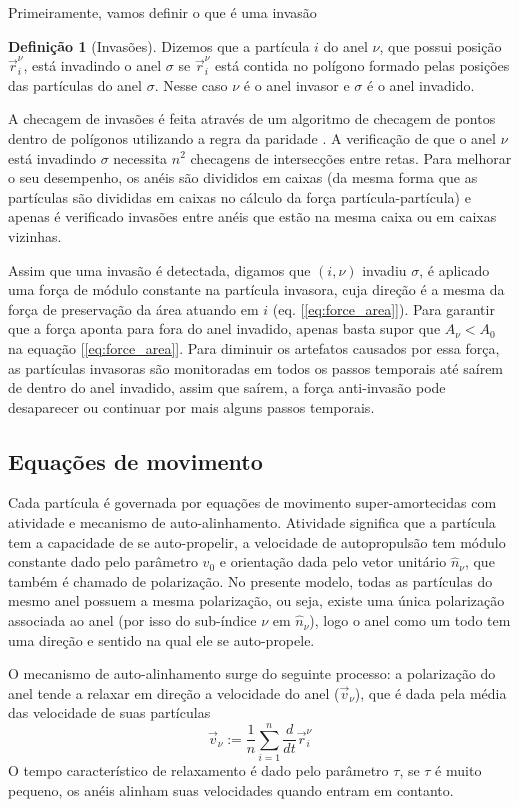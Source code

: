 \documentclass{article}
\theoremstyle{definition}
\newtheorem{definition}{Definição}[section]
\def \quantity#1#2#3{\vec{#1}_{#2}^{#3}}
\def \pos#1#2{\quantity{r}{#1}{#2}}
\begin{document}
Primeiramente, vamos definir o que é uma invasão
\begin{definition}[Invasões]
\label{def:invasion}
Dizemos que a partícula $i$ do anel $\nu$, que possui posição $\quantity{r}{i}{\nu}$, está invadindo o anel $\sigma$ se $\quantity{r}{i}{\nu}$ está contida no polígono formado pelas posições das partículas do anel $\sigma$. Nesse caso $\nu$ é o anel invasor e $\sigma$ é o anel invadido.
\end{definition}
A checagem de invasões é feita através de um algoritmo de checagem de pontos dentro de polígonos utilizando a regra da paridade \cite{hormann_point_2001}. A verificação de que o anel $\nu$ está invadindo $\sigma$ necessita $n^2$ checagens de intersecções entre retas. Para melhorar o seu desempenho, os anéis são divididos em caixas (da mesma forma que as partículas são divididas em caixas no cálculo da força partícula-partícula) e apenas é verificado invasões entre anéis que estão na mesma caixa ou em caixas vizinhas. 

Assim que uma invasão é detectada, digamos que $(i, \nu)$ invadiu $\sigma$, é aplicado uma força de módulo constante na partícula invasora, cuja direção é a mesma da força de preservação da área atuando em $i$ (eq. [\ref{eq:force_area}]). Para garantir que a força aponta para fora do anel invadido, apenas basta supor que $A_\nu < A_0$ na equação [\ref{eq:force_area}]. Para diminuir os artefatos causados por essa força, as partículas invasoras são monitoradas em todos os passos temporais até saírem de dentro do anel invadido, assim que saírem, a força anti-invasão pode desaparecer ou continuar por mais alguns passos temporais. 

\subsection{Equações de movimento}
Cada partícula é governada por equações de movimento super-amortecidas com atividade e mecanismo de auto-alinhamento. Atividade significa que a partícula tem a capacidade de se auto-propelir, a velocidade de autopropulsão tem módulo constante dado pelo parâmetro $v_0$ e orientação dada pelo vetor unitário $\hat n_\nu$, que também é chamado de polarização. No presente modelo, todas as partículas do mesmo anel possuem a mesma polarização, ou seja, existe uma única polarização associada ao anel (por isso do sub-índice $\nu$ em $\hat n_\nu$), logo o anel como um todo tem uma direção e sentido na qual ele se auto-propele. 

O mecanismo de auto-alinhamento surge do seguinte processo: a polarização do anel tende a relaxar em direção a velocidade do anel ($\vec v_\nu$), que é dada pela média das velocidade de suas partículas 
\begin{equation}
\vec v_{\nu} := \frac{1}{n} \sum_{i=1}^n \frac{d}{dt}\pos{i}{\nu}
\label{eq:vel_cm}
\end{equation}
O tempo característico de relaxamento é dado pelo parâmetro $\tau$, se $\tau$ é muito pequeno, os anéis alinham suas velocidades quando entram em contanto.
\end{document}
